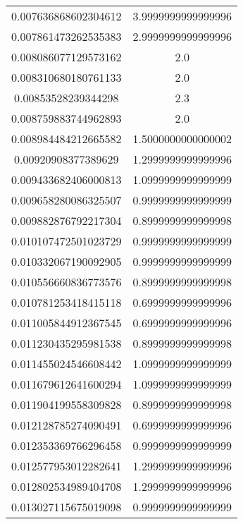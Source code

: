 \begin{table}
\begin{tabular}{S[]S[]}
0.007636868602304612 & 3.9999999999999996\\
0.007861473262535383 & 2.9999999999999996\\
0.008086077129573162 & 2.0\\
0.008310680180761133 & 2.0\\
0.00853528239344298 & 2.3\\
0.008759883744962893 & 2.0\\
0.008984484212665582 & 1.5000000000000002\\
0.00920908377389629 & 1.2999999999999996\\
0.009433682406000813 & 1.0999999999999999\\
0.009658280086325507 & 0.9999999999999999\\
0.009882876792217304 & 0.8999999999999998\\
0.010107472501023729 & 0.9999999999999999\\
0.010332067190092905 & 0.9999999999999999\\
0.010556660836773576 & 0.8999999999999998\\
0.010781253418415118 & 0.6999999999999996\\
0.011005844912367545 & 0.6999999999999996\\
0.011230435295981538 & 0.8999999999999998\\
0.011455024546608442 & 1.0999999999999999\\
0.011679612641600294 & 1.0999999999999999\\
0.011904199558309828 & 0.8999999999999998\\
0.012128785274090491 & 0.6999999999999996\\
0.012353369766296458 & 0.9999999999999999\\
0.012577953012282641 & 1.2999999999999996\\
0.012802534989404708 & 1.2999999999999996\\
0.013027115675019098 & 0.9999999999999999\\
\bottomrule
\end{tabular}\end{table}